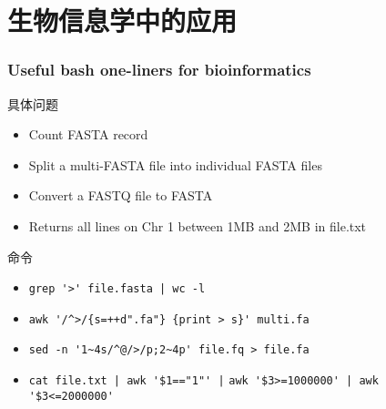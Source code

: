 \section{生物信息学中的应用}
\begin{frame}[fragile]
  \frametitle{Useful bash one-liners for bioinformatics}
  \begin{block}{具体问题}
    \begin{itemize}
      \item<2-> Count FASTA record
      \item<4-> Split a multi-FASTA file into individual FASTA files
      \item<6-> Convert a FASTQ file to FASTA 
      \item<8-> Returns all lines on Chr 1 between 1MB and 2MB in file.txt 
    \end{itemize}
  \end{block}
  \begin{block}{命令}
    \begin{itemize}
      \item<3-> \verb=grep '>' file.fasta | wc -l=
      \item<5-> \verb|awk '/^>/{s=++d".fa"} {print > s}' multi.fa|
      \item<7-> \verb|sed -n '1~4s/^@/>/p;2~4p' file.fq > file.fa|
      \item<9-> \verb~cat file.txt | awk '$1=="1"' |~ 
	\verb~awk '$3>=1000000' | awk '$3<=2000000'~
    \end{itemize}
  \end{block}
\end{frame}


